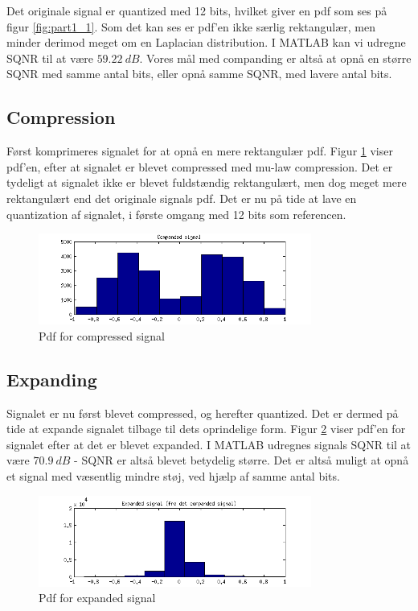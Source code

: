  Det originale signal er quantized med 12 bits, hvilket giver en pdf som ses på figur \ref{fig:part1_1}. Som det kan ses er pdf'en ikke særlig rektangulær, men minder derimod meget om en Laplacian distribution. I MATLAB kan vi udregne SQNR til at være $59.22\ dB$. Vores mål med companding er altså at opnå en større SQNR med samme antal bits, eller opnå samme SQNR, med lavere antal bits. 

\subsection{Compression}
Først komprimeres signalet for at opnå en mere rektangulær pdf. Figur \ref{fig:part1_2} viser pdf'en, efter at signalet er blevet compressed med mu-law compression. Det er tydeligt at signalet ikke er blevet fuldstændig rektangulært, men dog meget mere rektangulært end det originale signals pdf. Det er nu på tide at lave en quantization af signalet, i første omgang med 12 bits som referencen.

\begin{figure}[!ht]
	\centering
	\includegraphics[width=0.8\textwidth]{resources/part1_compressed}
 	\caption{Pdf for compressed signal}
 	\label{fig:part1_2}
\end{figure}

\subsection{Expanding}
Signalet er nu først blevet compressed, og herefter quantized. Det er dermed på tide at expande signalet tilbage til dets oprindelige form. Figur \ref{fig:part1_3} viser pdf'en for signalet efter at det er blevet expanded. I MATLAB udregnes signals SQNR til at være $70.9\ dB$ - SQNR er altså blevet betydelig større. Det er altså muligt at opnå et signal med væsentlig mindre støj, ved hjælp af samme antal bits.

\begin{figure}[!ht]
	\centering
	\includegraphics[width=0.8\textwidth]{resources/part1_expanded}
 	\caption{Pdf for expanded signal}
 	\label{fig:part1_3}
\end{figure}

